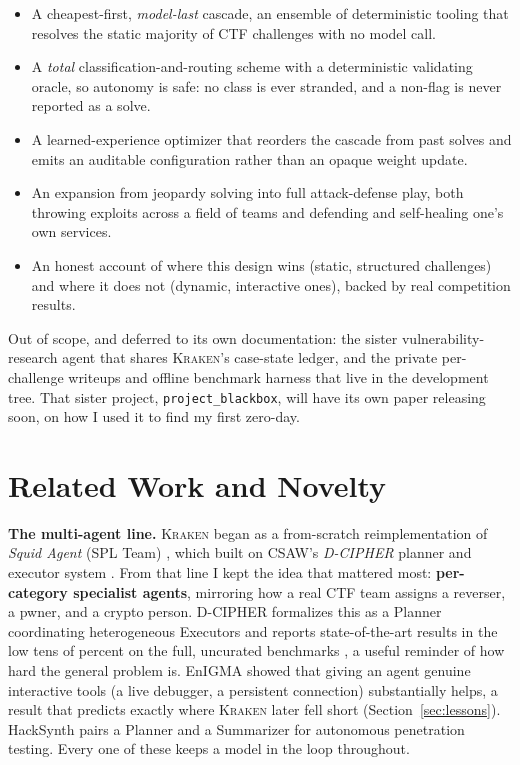 \documentclass[10pt,twocolumn]{article}
\newcommand{\kraken}{\textsc{Kraken}}
\begin{document}
\begin{itemize}[leftmargin=1.1em,itemsep=1.5pt,topsep=2pt]
\item A cheapest-first, \emph{model-last} cascade, an ensemble of deterministic tooling that resolves
the static majority of CTF challenges with no model call.
\item A \emph{total} classification-and-routing scheme with a deterministic validating oracle, so
autonomy is safe: no class is ever stranded, and a non-flag is never reported as a solve.
\item A learned-experience optimizer that reorders the cascade from past solves and emits an auditable
configuration rather than an opaque weight update.
\item An expansion from jeopardy solving into full attack-defense play, both throwing exploits across
a field of teams and defending and self-healing one's own services.
\item An honest account of where this design wins (static, structured challenges) and where it does
not (dynamic, interactive ones), backed by real competition results.
\end{itemize}
\noindent Out of scope, and deferred to its own documentation: the sister vulnerability-research
agent that shares \kraken{}'s case-state ledger, and the private per-challenge writeups and offline
benchmark harness that live in the development tree. That sister project, \texttt{project\_blackbox},
will have its own paper releasing soon, on how I used it to find my first zero-day.

\section{Related Work and Novelty}
\label{sec:related}

\textbf{The multi-agent line.} \kraken{} began as a from-scratch reimplementation of \emph{Squid
Agent} (SPL Team) \cite{squid2024}, which built on CSAW's \emph{D-CIPHER} planner and executor system
\cite{udeshi2025dcipher}. From that line I kept the idea that mattered most: \textbf{per-category
specialist agents}, mirroring how a real CTF team assigns a reverser, a pwner, and a crypto person.
D-CIPHER formalizes this as a Planner coordinating heterogeneous Executors and reports
state-of-the-art results in the low tens of percent on the full, uncurated benchmarks
\cite{udeshi2025dcipher}, a useful reminder of how hard the general problem is. EnIGMA
\cite{abramovich2025enigma} showed that giving an agent genuine interactive tools (a live debugger, a
persistent connection) substantially helps, a result that predicts exactly where \kraken{} later fell
short (Section~\ref{sec:lessons}). HackSynth \cite{muzsai2024hacksynth} pairs a Planner and a
Summarizer for autonomous penetration testing. Every one of these keeps a model in the loop
throughout.
\end{document}
